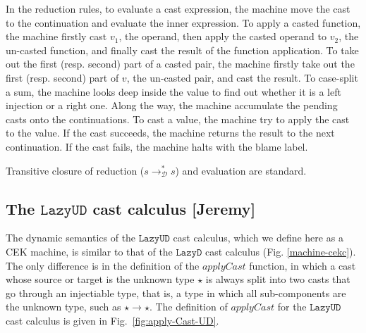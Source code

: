 \documentclass[acmsmall,review,anonymous]{acmart}\settopmatter{printfolios=true,printccs=false,printacmref=false}
\newcommand{\lazyUD}{$\mathtt{Lazy UD}$}
\newcommand{\lazyD}{$\mathtt{Lazy D}$}
\newcommand{\judgeDCreduceTrans}[2]{#1 \longrightarrow_{\mathcal{D}}^{*} #2}
\begin{document}
In the reduction rules, to evaluate a cast expression, the machine move the 
cast to the continuation and evaluate the inner expression. To apply a casted 
function, the machine firstly cast $ v_1 $, the operand, then apply the casted 
operand to $ v_2 $, the un-casted function, and finally cast the result of the 
function application. To take out the first (resp. second) part of a casted 
pair, the machine firstly take out the first (resp. second) part of $ v $, the 
un-casted pair, and cast the result. To case-split a sum, the machine looks 
deep inside the value to find out whether it is a left injection or a right 
one.
Along the way, the machine accumulate the pending casts onto the 
continuations. To cast a value, the machine try to apply the cast to the value. 
If the cast succeeds, the machine returns the result to the next continuation. 
If the cast fails, the machine halts with the blame label.

Transitive closure of reduction ($ \judgeDCreduceTrans{s}{s} $) and evaluation 
are 
standard.

\subsection{The \lazyUD{} cast calculus [Jeremy]}

The dynamic semantics of the \lazyUD{} cast calculus, which we define here as a
CEK machine, is similar to that of the \lazyD{} cast calculus
(Fig. \ref{machine-cekc}). The only difference is in the definition of
the $\mathit{applyCast}$ function, in which a cast whose source or
target is the unknown type $\star$ is always split into two casts that
go through an injectiable type, that is, a type in which all
sub-components are the unknown type, such as $\star \to \star$. The
definition of $\mathit{applyCast}$ for the \lazyUD{} cast calculus is given in
Fig.~\ref{fig:apply-Cast-UD}.
\end{document}
